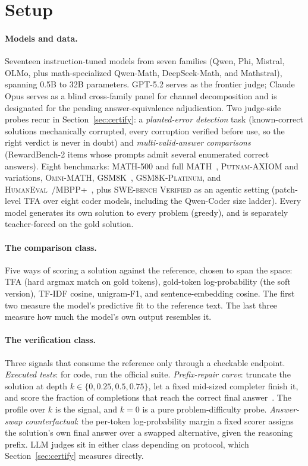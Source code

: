 \documentclass[11pt]{article}
\newcommand{\tfa}{\textsc{TFA}}
\begin{document}
\section{Setup}
\label{sec:setup}

\paragraph{Models and data.}
Seventeen instruction-tuned models from seven families (Qwen, Phi, Mistral, OLMo, plus math-specialized Qwen-Math, DeepSeek-Math, and Mathstral), spanning 0.5B to 32B parameters.
GPT-5.2 serves as the frontier judge; Claude Opus serves as a blind cross-family panel for channel decomposition and is designated for the pending answer-equivalence adjudication.
Two judge-side probes recur in Section~\ref{sec:certify}: a \emph{planted-error detection} task (known-correct solutions mechanically corrupted, every corruption verified before use, so the right verdict is never in doubt) and \emph{multi-valid-answer comparisons} (RewardBench-2 items whose prompts admit several enumerated correct answers).
Eight benchmarks: \textsc{MATH-500} and full \textsc{MATH}~\cite{hendrycks2021math}, \textsc{Putnam-AXIOM} and variations, \textsc{Omni-MATH}, \textsc{GSM8K}~\cite{cobbe2021gsm8k}, \textsc{GSM8K-Platinum}, and \textsc{HumanEval}~\cite{chen2021codex}/\textsc{MBPP+}~\cite{austin2021mbpp,liu2023evalplus}, plus \textsc{SWE-bench Verified} as an agentic setting (patch-level \tfa{} over eight coder models, including the Qwen-Coder size ladder).
Every model generates its own solution to every problem (greedy), and is separately teacher-forced on the gold solution.

\paragraph{The comparison class.}
Five ways of scoring a solution against the reference, chosen to span the space: \tfa{} (hard argmax match on gold tokens), gold-token log-probability (the soft version), TF-IDF cosine, unigram-F1, and sentence-embedding cosine.
The first two measure the model's predictive fit to the reference text.
The last three measure how much the model's own output resembles it.

\paragraph{The verification class.}
Three signals that consume the reference only through a checkable endpoint.
\emph{Executed tests}: for code, run the official suite.
\emph{Prefix-repair curve}: truncate the solution at depth $k \in \{0, 0.25, 0.5, 0.75\}$, let a fixed mid-sized completer finish it, and score the fraction of completions that reach the correct final answer~\cite{lightman2023verify,wang2022selfconsistency}.
The profile over $k$ is the signal, and $k{=}0$ is a pure problem-difficulty probe.
\emph{Answer-swap counterfactual}: the per-token log-probability margin a fixed scorer assigns the solution's own final answer over a swapped alternative, given the reasoning prefix.
LLM judges sit in either class depending on protocol, which Section~\ref{sec:certify} measures directly.
\end{document}
